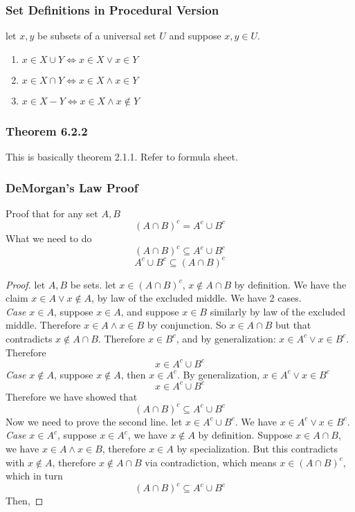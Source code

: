 \documentclass[12pt]{book}
\newcommand{\paren}[1]{\left( #1 \right)}
\begin{document}
    \subsubsection{Set Definitions in Procedural Version}
        let $x,y$ be subsets of a universal set $U$ and suppose $x,y \in U$.
        \begin{enumerate}
            \item \( x \in X \cup Y \iff x \in X \vee x \in Y\)
            \item \( x \in X \cap Y \iff x \in X \wedge x \in Y\)
            \item \( x \in X - Y \iff x \in X \wedge x \notin Y\)
        \end{enumerate}
        
    \subsubsection{Theorem 6.2.2}
    This is basically theorem 2.1.1. Refer to formula sheet.

    \subsubsection{DeMorgan's Law Proof}
    Proof that for any set $A,B$
    \[
    \paren{A\cap B}^c = A^c \cup B^c
    \]
    What we need to do
    \[
    \paren{A \cap B}^c \subseteq A^c \cup B^c 
    \]
    \[
    A^c \cup B^c \subseteq \paren{A \cap B}^c
    \]
    \begin{proof}
        let $A,B$ be sets. let $x \in \paren{A \cap B}^c$, $x \notin A\cap B$ by definition. We have the claim $x \in A \vee x \notin A$, by law of the excluded middle. We have 2 cases.\\
        \textit{Case $x \in A$}, suppose $x \in A$, and suppose $x \in B$ similarly by law of the excluded middle. Therefore $x \in A \wedge x \in B$ by conjunction. So $x \in A \cap B$ but that contradicts $x \notin A \cap B$. Therefore $x \in B^c$, and by generalization: $x \in A^c \vee x \in B^c$. Therefore
            \[
            x \in A^c \cup B^c
            \]
        \textit{Case $x \notin A$}, suppose $x \notin A$, then $x \in A^c$. By generalization, $x\in A^c \vee x \in B^c$
            \[
            x \in A^c \cup B^c
            \]
        Therefore we have showed that
            \[
            \paren{A \cap B}^c \subseteq A^c \cup B^c 
            \]
        Now we need to prove the second line. let $x \in A^c \cup B^c$. We have $x \in A^c \vee x \in B^c$. \\
        \textit{Case $x\in A^c$}, suppose $x \in A^c$, we have $x \notin A$ by definition. Suppose $x \in A \cap B$, we have $x \in A \wedge x \in B$, therefore $x \in A$ by specialization. But this contradicts with $x \notin A$, therefore $x \notin A \cap B$ via contradiction, which means $x \in \paren{A \cap B}^c$, which in turn
            \[
            \paren{A \cap B}^c \subseteq A^c \cup B^c 
            \]
        Then, 
    \end{proof}
\end{document}

